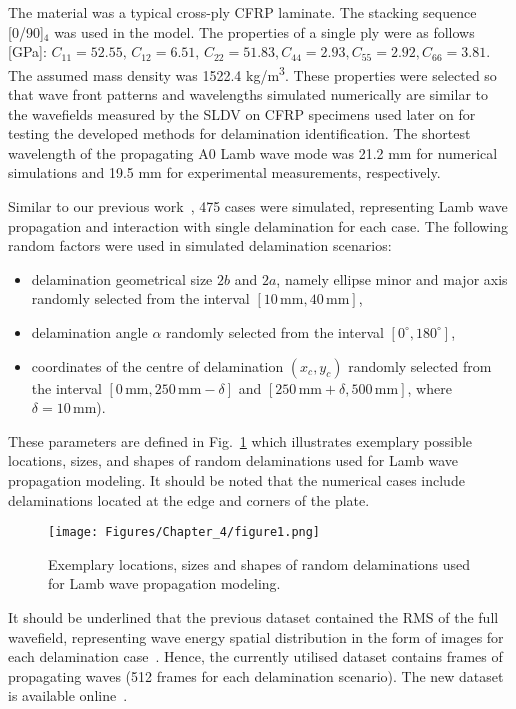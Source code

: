 The material was a typical cross-ply CFRP laminate. 
The stacking sequence [0/90]\(_4\) was used in the model. 
The properties of a single ply were as follows [GPa]:
\(C_{11} = 52.55, \, C_{12} = 6.51, \, C_{22} = 51.83, C_{44} = 2.93, C_{55} = 2.92, C_{66} = 3.81\). 
The assumed mass density was 1522.4 kg/m\textsuperscript{3}.
These properties were selected so that wave front patterns and wavelengths simulated numerically are similar to the wavefields measured by the SLDV on CFRP specimens used later on for testing the developed methods for delamination identification.
The shortest wavelength of the propagating A0 Lamb wave mode was 21.2 mm for numerical simulations and 19.5 mm for experimental measurements, respectively.

Similar to our previous work~\cite{Ijjeh2021}, 475 cases were simulated, representing Lamb wave propagation and interaction with single delamination for each case. 
The following random factors were used in simulated delamination scenarios:
\begin{itemize}
	\item delamination geometrical size	\(2b\) and \(2a\), namely ellipse minor and major axis randomly selected from the interval \(\left[10 \, \textrm{mm}, 40\, \textrm{mm}\right]\),
	\item delamination angle \(\alpha\) randomly selected from the interval \( \left[ 0^{\circ}, 180^{\circ} \right]\),
	\item coordinates of the centre of delamination \((x_c,y_c)\) randomly selected from the interval \(\left[0\, \textrm{mm}, 250\, \textrm{mm} -\delta \right]\) and \( \left[250\, \textrm{mm}+\delta, 500\, \textrm{mm} \right] \), where \(\delta = 10\, \textrm{mm}\)).
\end{itemize}
These parameters are defined in Fig.~\ref{fig:random_delaminations} which illustrates exemplary possible locations, sizes, and shapes of random delaminations used for Lamb wave propagation modeling.
It should be noted that the numerical cases include delaminations located at the edge and corners of the plate.
\begin{figure}[!h]
	\centering
	\texttt{[image: Figures/Chapter\_4/figure1.png]}
	\caption{Exemplary locations, sizes and shapes of random delaminations used for Lamb wave propagation modeling.}
	\label{fig:random_delaminations}
\end{figure}

It should be underlined that the previous dataset contained the RMS of the full wavefield, representing wave energy spatial distribution in the form of images for each delamination case~\cite{Kudela2020d}.
Hence, the currently utilised dataset contains frames of propagating waves (512 frames for each delamination scenario).
The new dataset is available online~\cite{kudela_pawel_2021_5414555}.

